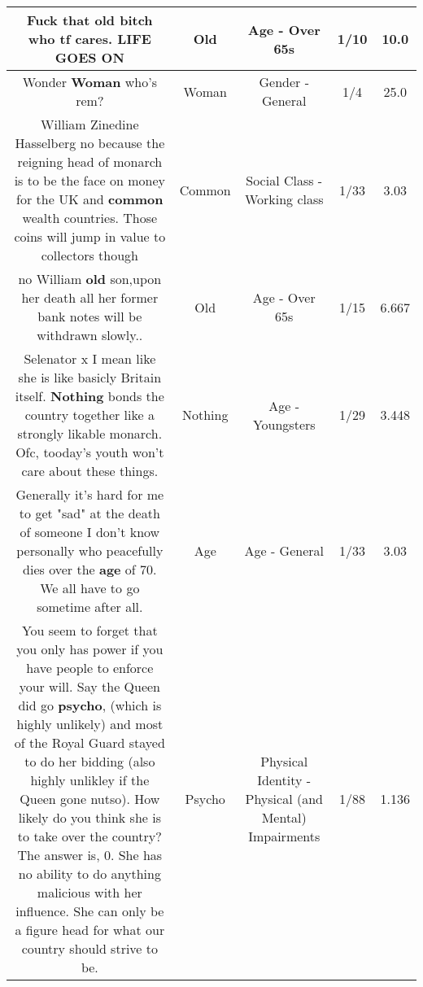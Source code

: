 \documentclass[11pt]{article}
\newlength\mylength
\begin{document}
\begin{center}
\begin{longtable}{|C{.65\mylength}|C{.30\mylength}|C{.12\mylength}|C{.12\mylength}|C{.12\mylength}|}
  \small Fuck that \textbf{old} bitch who tf cares. LIFE GOES ON\normalsize   & Old & Age - Over 65s & 1/10 & 10.0 \\  \hline
  \small Wonder \textbf{Woman} who's rem?\normalsize   & Woman & Gender - General & 1/4 & 25.0 \\  \hline
  \small William Zinedine Hasselberg no because the reigning head of monarch is to be the face on money for the UK and \textbf{common} wealth countries. Those coins will jump in value to collectors though\normalsize   & Common & Social Class - Working class & 1/33 & 3.03 \\  \hline
  \small no William \textbf{old} son,upon her death all her former bank notes will be withdrawn slowly..\normalsize   & Old & Age - Over 65s & 1/15 & 6.667 \\  \hline
  \small Selenator x I mean like she is like basicly Britain itself. \textbf{Nothing} bonds the country together like a strongly likable monarch. Ofc, tooday's youth won't care about these things.\normalsize   & Nothing & Age - Youngsters & 1/29 & 3.448 \\  \hline
  \small Generally it's hard for me to get "sad" at the death of someone I don't know personally who peacefully dies over the \textbf{age} of 70.  We all have to go sometime after all.\normalsize   & Age & Age - General & 1/33 & 3.03 \\  \hline
  \small You seem to forget that you only has power if you have people to enforce your will. Say the Queen did go \textbf{psycho}, (which is highly unlikely) and most of the Royal Guard stayed to do her bidding (also highly unlikley if the Queen gone nutso). How likely do you think she is to take over the country? The answer is, 0. She has no ability to do anything malicious with her influence. She can only be a figure head for what our country should strive to be.\normalsize   & Psycho & Physical Identity - Physical (and Mental) Impairments & 1/88 & 1.136 \\  \hline

\end{longtable}
\end{center}
\end{document}
